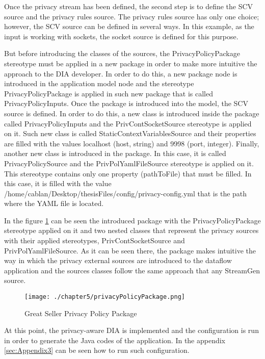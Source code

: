 Once the privacy stream has been defined, the second step is to define the SCV source and the privacy rules source. The privacy rules source has only one choice; however, the SCV source can be defined in several ways. In this example, as the input is working with sockets, the socket source is defined for this purpose.

But before introducing the classes of the sources, the PrivacyPolicyPackage stereotype must be applied in a new package in order to make more intuitive the approach to the DIA developer. In order to do this, a new package node is introduced in the application model node and the stereotype PrivacyPolicyPackage is applied in such new package that is called PrivacyPolicyInputs. Once the package is introduced into the model, the SCV source is defined. In order to do this, a new class is introduced inside the package called PrivacyPolicyInputs and the PrivContSocketSource stereotype is applied on it. Such new class is called StaticContextVariablesSource and their properties are filled with the values localhost (host, string) and 9998 (port, integer). Finally, another new class is introduced in the package. In this case, it is called PrivacyPolicySource and the PrivPolYamlFileSource stereotype is applied on it. This stereotype contains only one property (pathToFile) that must be filled. In this case, it is filled with the value /home/cablan/Desktop/thesisFiles/config/privacy-config.yml that is the path where the YAML file is located.

In the figure \ref{fig:Great Seller Privacy Policy Package} can be seen the introduced package with the PrivacyPolicyPackage stereotype applied on it and two nested classes that represent the privacy sources with their applied stereotypes, PrivContSocketSource and PrivPolYamlFileSource. As it can be seen there, the package makes intuitive the way in which the privacy external sources are introduced to the dataflow application and the sources classes follow the same approach that any StreamGen source. 

\begin{figure}
\centering
{\texttt{[image: ./chapter5/privacyPolicyPackage.png]}}
\caption{Great Seller Privacy Policy Package}
\label{fig:Great Seller Privacy Policy Package}
\end{figure}

At this point, the privacy-aware DIA is implemented and the configuration is run in order to generate the Java codes of the application. In the appendix \ref{sec:Appendix3} can be seen how to run such configuration.

